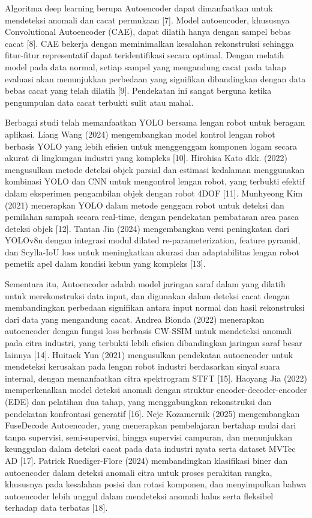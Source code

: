 Algoritma deep learning berupa Autoencoder dapat dimanfaatkan untuk
mendeteksi anomali dan cacat permukaan [7]. Model autoencoder,
khususnya Convolutional Autoencoder (CAE), dapat dilatih hanya dengan
sampel bebas cacat [8]. CAE bekerja dengan meminimalkan kesalahan
rekonstruksi sehingga fitur-fitur representatif dapat teridentifikasi
secara optimal. Dengan melatih model pada data normal, setiap sampel
yang mengandung cacat pada tahap evaluasi akan menunjukkan perbedaan
yang signifikan dibandingkan dengan data bebas cacat yang telah
dilatih [9]. Pendekatan ini sangat berguna ketika pengumpulan data
cacat terbukti sulit atau mahal. \par

Berbagai studi telah memanfaatkan YOLO bersama lengan robot untuk
beragam aplikasi. Liang Wang (2024) mengembangkan model kontrol
lengan robot berbasis YOLO yang lebih efisien untuk menggenggam
komponen logam secara akurat di lingkungan industri yang kompleks
[10]. Hirohisa Kato dkk. (2022) mengusulkan metode deteksi objek
parsial dan estimasi kedalaman menggunakan kombinasi YOLO dan CNN
untuk mengontrol lengan robot, yang terbukti efektif dalam eksperimen
pengambilan objek dengan robot 4DOF [11]. Munhyeong Kim (2021)
menerapkan YOLO dalam metode genggam robot untuk deteksi dan
pemilahan sampah secara real-time, dengan pendekatan pembatasan area
pasca deteksi objek [12]. Tantan Jin (2024) mengembangkan versi
peningkatan dari YOLOv8n dengan integrasi modul dilated
re-parameterization, feature pyramid, dan Scylla-IoU loss untuk
meningkatkan akurasi dan adaptabilitas lengan robot pemetik apel
dalam kondisi kebun yang kompleks [13]. \par

Sementara itu, Autoencoder adalah model jaringan saraf dalam yang
dilatih untuk merekonstruksi data input, dan digunakan dalam deteksi
cacat dengan membandingkan perbedaan signifikan antara input normal
dan hasil rekonstruksi dari data yang mengandung cacat. Andrea Bionda
(2022) menerapkan autoencoder dengan fungsi loss berbasis CW-SSIM
untuk mendeteksi anomali pada citra industri, yang terbukti lebih
efisien dibandingkan jaringan saraf besar lainnya [14]. Huitaek Yun
(2021) mengusulkan pendekatan autoencoder untuk mendeteksi kerusakan
pada lengan robot industri berdasarkan sinyal suara internal, dengan
memanfaatkan citra spektrogram STFT [15]. Haoyang Jia (2022)
memperkenalkan model deteksi anomali dengan struktur
encoder-decoder-encoder (EDE) dan pelatihan dua tahap, yang
menggabungkan rekonstruksi dan pendekatan konfrontasi generatif [16].
Nejc Kozamernik (2025) mengembangkan FuseDecode Autoencoder, yang
menerapkan pembelajaran bertahap mulai dari tanpa supervisi,
semi-supervisi, hingga supervisi campuran, dan menunjukkan keunggulan
dalam deteksi cacat pada data industri nyata serta dataset MVTec AD
[17]. Patrick Ruediger-Flore (2024) membandingkan klasifikasi biner
dan autoencoder dalam deteksi anomali citra untuk proses perakitan
rangka, khususnya pada kesalahan posisi dan rotasi komponen, dan
menyimpulkan bahwa autoencoder lebih unggul dalam mendeteksi anomali
halus serta fleksibel terhadap data terbatas [18]. \par

